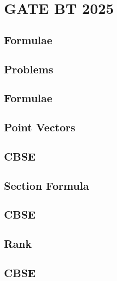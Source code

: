 \documentclass[journal]{IEEEtran}
\begin{document}
\newpage


\tableofcontents

\newpage
\onecolumn


\renewcommand{\thetable}{\theenumi}

\section{GATE BT 2025}
\subsection{Formulae}

\newpage
\subsection{Problems}

\iffalse
\subsection{Formulae}

\subsection{Point Vectors}

\subsection{CBSE}

%
\subsection{Section Formula}

\subsection{CBSE}

\subsection{Rank}

\subsection{CBSE}

\end{document}
